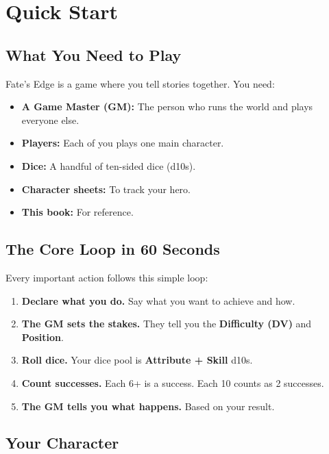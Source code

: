 \chapter{Quick Start}
\label{ch:quickstart}

\section{What You Need to Play}

Fate's Edge is a game where you tell stories together. You need:
\begin{itemize}
  \item \textbf{A Game Master (GM):} The person who runs the world and plays everyone else.
  \item \textbf{Players:} Each of you plays one main character.
  \item \textbf{Dice:} A handful of ten-sided dice (d10s).
  \item \textbf{Character sheets:} To track your hero.
  \item \textbf{This book:} For reference.
\end{itemize}

\section{The Core Loop in 60 Seconds}

Every important action follows this simple loop:

\begin{enumerate}
  \item \textbf{Declare what you do.} Say what you want to achieve and how.
  \item \textbf{The GM sets the stakes.} They tell you the \textbf{Difficulty (DV)} and \textbf{Position}.
  \item \textbf{Roll dice.} Your dice pool is \textbf{Attribute + Skill} d10s.
  \item \textbf{Count successes.} Each 6+ is a success. Each 10 counts as 2 successes.
  \item \textbf{The GM tells you what happens.} Based on your result.
\end{enumerate}

\section{Your Character}

